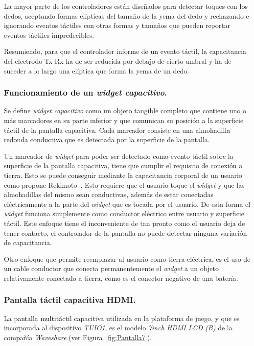 La mayor parte de los controladores están diseñados para detectar toques con los dedos, aceptando formas elípticas del tamaño de la yema del dedo y rechazando e ignorando eventos táctiles con otras formas y tamaños que pueden reportar eventos táctiles impredecibles.

Resumiendo, para que el controlador informe de un evento táctil, la capacitancia del electrodo Tx-Rx ha de ser reducida por debajo de cierto umbral y ha de suceder a lo largo una elíptica que forma la yema de un dedo.


\subsubsection{Funcionamiento de un \emph{widget capacitivo}.}

Se define \emph{widget capacitivo} como un objeto tangible completo que contiene uno o más marcadores en su parte inferior y que comunican su posición a la superficie táctil de la pantalla capacitiva. Cada marcador consiste en una almohadilla redonda conductiva que es detectada por la superficie de la pantalla.

Un marcador de \emph{widget} para poder ser detectado como evento táctil sobre la superficie de la pantalla capacitiva, tiene que cumplir el requisito de conexión a tierra. Esto se puede conseguir mediante la capacitancia corporal de un usuario como propone Rekimoto~\cite{Rekimoto}. Esto requiere que el usuario toque el \emph{widget} y que las almohadillas del mismo sean conductivas, además de estar conectadas eléctricamente a la parte del \emph{widget} que es tocada por el usuario. De esta forma el \emph{widget} funciona simplemente como conductor eléctrico entre usuario y superficie táctil. Este enfoque tiene el inconveniente de tan pronto como el usuario deja de tener contacto, el controlador de la pantalla no puede detectar ninguna variación de capacitancia.

Otro enfoque que permite reemplazar al usuario como tierra eléctrica, es el uso de un cable conductor que conecta permanentemente el \emph{widget} a un objeto relativamente conectado a tierra, como es el conector negativo de una batería.

\subsubsection{Pantalla táctil capacitiva HDMI.}
La pantalla multitáctil capacitiva utilizada en la plataforma de juego, y que es incorporada al dispositivo \emph{TUIO1}, es el modelo \emph{7inch HDMI LCD (B)} de la compañía \emph{Waveshare} (ver Figura~\ref{fig:Pantalla7}).

